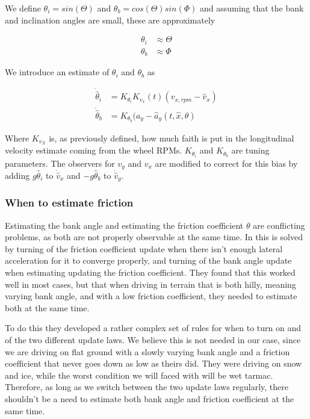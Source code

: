 We define $\theta_i = sin(\Theta)$ and $\theta_b = cos(\Theta)sin(\Phi)$ and assuming that the bank and inclination angles are small, these are approximately 

\begin{align}
    \theta_i & \approx \Theta \\
    \theta_b & \approx \Phi
\end{align}

We introduce an estimate of $\theta_i$ and $\theta_b$ as

\begin{align}
    \dot{\hat{\theta}}_i & = K_{\theta_i}K_{v_x}(t)(v_{x,rpm} - \hat{v}_x) \\
    \dot{\hat{\theta}}_b & = K_{\theta_b}(a_y-\hat{a}_y(t,\hat{x},\theta)
\end{align}

Where $K_{v_X}$ is, as previously defined, how much faith is put in the longitudinal velocity estimate coming from the wheel RPMs. $K_{\theta_i}$ and $K_{\theta_b}$ are tuning parameters. The observers for $v_y$ and $v_x$ are modified to correct for this bias by adding $g\hat{\theta}_i$ to $\dot{\hat{v}}_x$ and $-g\hat{\theta}_b$ to $\dot{\hat{v}}_y$. 

\subsubsection{When to estimate friction}

Estimating the bank angle and estimating the friction coefficient $\theta$ are conflicting problems, as both are not properly observable at the same time. In \cite{MainStateEst} this is solved by turning of the friction coefficient update when there isn't enough lateral acceleration for it to converge properly, and turning of the bank angle update when estimating updating the friction coefficient. They found that this worked well in most cases, but that when driving in terrain that is both hilly, meaning varying bank angle, and with a low friction coefficient, they needed to estimate both at the same time. 

To do this they developed a rather complex set of rules for when to turn on and of the two different update laws. We believe this is not needed in our case, since we are driving on flat ground with a slowly varying bank angle and a friction coefficient that never goes down as low as theirs did. They were driving on snow and ice, while the worst condition we will faced with will be wet tarmac. Therefore, as long as we switch between the two update laws regularly, there shouldn't be a need to estimate both bank angle and friction coefficient at the same time. 

